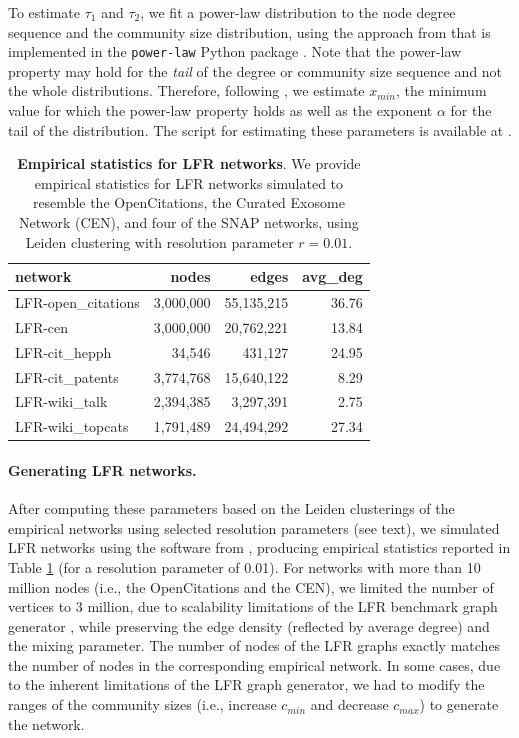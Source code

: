 \documentclass[11pt]{article}   	%
\begin{document}
To estimate $\tau_1$ and $\tau_2$, we fit a power-law distribution to the node degree sequence and the community size distribution, using the approach from \cite{clauset2009power} that is implemented in the \texttt{power-law} Python package \citep{alstott2014powerlaw}. Note that the power-law property may hold for the \textit{tail} of the degree or community size sequence and not the whole distributions. Therefore, following \cite{clauset2009power}, we estimate $x_{min}$, the minimum value for which the power-law property holds as well as the exponent $\alpha$ for the tail of the distribution. The script for estimating these parameters is available at \cite{analysis_scripts}.

\begin{table}[ht]
\caption{\textbf{Empirical statistics for LFR networks}. We provide empirical statistics for LFR networks simulated to  resemble the OpenCitations, the Curated Exosome Network (CEN), and four of the SNAP networks, using Leiden clustering with resolution parameter $r=0.01$. }
\centering
\begin{tabular}{lrrr}
  \hline
 network & nodes & edges & avg\_deg \\
  \hline
    LFR-open\_citations & 3,000,000  & 55,135,215 & 36.76 \\
    LFR-cen & 3,000,000 & 20,762,221 & 13.84 \\
    LFR-cit\_hepph &  34,546 & 431,127 & 24.95 \\
    LFR-cit\_patents & 3,774,768 & 15,640,122 & 8.29 \\
    LFR-wiki\_talk & 2,394,385 & 3,297,391 & 2.75 \\
    LFR-wiki\_topcats & 1,791,489 & 24,494,292 & 27.34 \\
 \hline
\end{tabular}
\label{tab:empirical-stats-LFR}
\end{table}

\paragraph{Generating LFR networks.}
After computing these parameters based on the Leiden clusterings of the empirical networks using selected resolution parameters (see text), we simulated LFR networks using the software from \cite{lancichinetti2008benchmark}, producing empirical statistics reported in Table \ref{tab:empirical-stats-LFR} (for a resolution parameter of 0.01). For networks with more than 10 million nodes (i.e., the OpenCitations and the CEN), we limited the number of vertices to 3 million, due to scalability limitations of  the LFR benchmark graph generator \citep{slota2019scalable}, while preserving the edge density (reflected by average degree) and the mixing parameter.  The number of nodes of the LFR graphs exactly matches the number of nodes in the corresponding empirical network. In some cases, due to the inherent limitations of the LFR graph generator, we had to modify the ranges of the community sizes (i.e., increase $c_{min}$ and decrease $c_{max}$) to generate the network.
\end{document}

